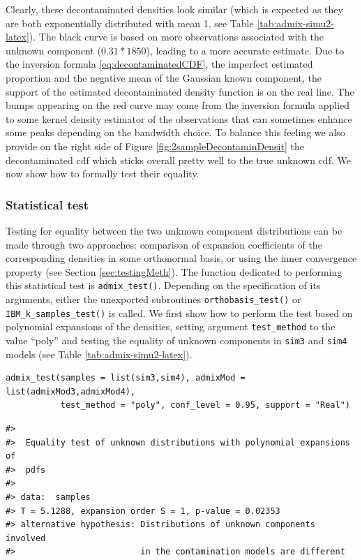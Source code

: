 Clearly, these decontaminated densities look similar (which is expected as they are both exponentially distributed with mean 1, see Table \ref{tab:admix-simu2-latex}). The black curve is based on more observations associated with the unknown component (\(0.31*1850\)), leading to a more accurate estimate. Due to the inversion formula \eqref{eq:decontaminatedCDF}, the imperfect estimated proportion and the negative mean of the Gaussian known component, the support of the estimated decontaminated density function is on the real line. The bumps appearing on the red curve may come from the inversion formula applied to some kernel density estimator of the observations that can sometimes enhance some peaks depending on the bandwidth choice. To balance this feeling we also provide on the right side of Figure \ref{fig:2sampleDecontaminDensit} the decontaminated cdf which sticks overall pretty well to the true unknown cdf. We now show how to formally test their equality.

\subsubsection{Statistical test}\label{statistical-test-1}

Testing for equality between the two unknown component distributions can be made through two approaches: comparison of expansion coefficients of the corresponding densities in some orthonormal basis, or using the inner convergence property (see Section \ref{sec:testingMeth}). The function dedicated to performing this statistical test is \texttt{admix\_test()}. Depending on the specification of its arguments, either the unexported subroutines \texttt{orthobasis\_test()} or \texttt{IBM\_k\_samples\_test()} is called.
We first show how to perform the test based on polynomial expansions of the densities, setting argument \texttt{test\_method} to the value ``poly'' and testing the equality of unknown components in \texttt{sim3} and \texttt{sim4} models (see Table \ref{tab:admix-simu2-latex}).

\begin{verbatim}
admix_test(samples = list(sim3,sim4), admixMod = list(admixMod3,admixMod4),
           test_method = "poly", conf_level = 0.95, support = "Real")
\end{verbatim}

\begin{verbatim}
#> 
#>  Equality test of unknown distributions with polynomial expansions of
#>  pdfs
#> 
#> data:  samples
#> T = 5.1288, expansion order S = 1, p-value = 0.02353
#> alternative hypothesis: Distributions of unknown components involved 
#>                         in the contamination models are different
\end{verbatim}

